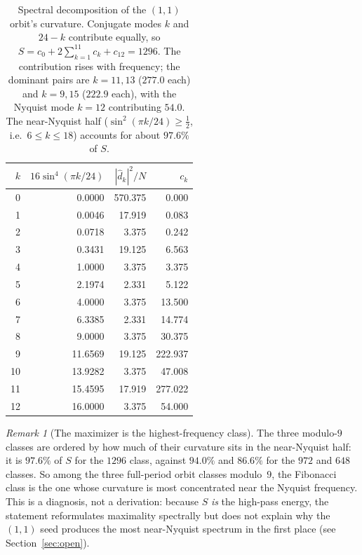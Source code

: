 \documentclass[12pt]{article}
\theoremstyle{remark}
\newtheorem{rem}{Remark}
\begin{document}
\begin{table}[h!]
\centering
\begin{tabular}{rrrr}
\toprule
$k$ & $16\sin^4(\pi k/24)$ & $|\hat d_k|^2/N$ & $c_k$\\
\midrule
0  & 0.0000  & 570.375 & 0.000\\
1  & 0.0046  & 17.919  & 0.083\\
2  & 0.0718  & 3.375   & 0.242\\
3  & 0.3431  & 19.125  & 6.563\\
4  & 1.0000  & 3.375   & 3.375\\
5  & 2.1974  & 2.331   & 5.122\\
6  & 4.0000  & 3.375   & 13.500\\
7  & 6.3385  & 2.331   & 14.774\\
8  & 9.0000  & 3.375   & 30.375\\
9  & 11.6569 & 19.125  & 222.937\\
10 & 13.9282 & 3.375   & 47.008\\
11 & 15.4595 & 17.919  & 277.022\\
12 & 16.0000 & 3.375   & 54.000\\
\bottomrule
\end{tabular}
\caption{Spectral decomposition of the $(1,1)$ orbit's curvature. Conjugate modes $k$ and
$24-k$ contribute equally, so $S=c_0+2\sum_{k=1}^{11}c_k+c_{12}=1296$. The contribution
rises with frequency; the dominant pairs are $k=11,13$ ($277.0$ each) and $k=9,15$
($222.9$ each), with the Nyquist mode $k=12$ contributing $54.0$. The near-Nyquist half
($\sin^2(\pi k/24)\ge\frac12$, i.e.\ $6\le k\le 18$) accounts for about $97.6\%$ of $S$.}
\label{tab:spectrum}
\end{table}

\begin{rem}[The maximizer is the highest-frequency class]
The three modulo-$9$ classes are ordered by how much of their curvature sits in the
near-Nyquist half: it is $97.6\%$ of $S$ for the $1296$ class, against $94.0\%$ and
$86.6\%$ for the $972$ and $648$ classes. So among the three full-period orbit classes
modulo~$9$, the Fibonacci class is the one whose curvature is most concentrated near the
Nyquist frequency. This is a diagnosis, not a derivation: because $S$ \emph{is} the
high-pass energy, the statement reformulates maximality spectrally but does not explain
why the $(1,1)$ seed produces the most near-Nyquist spectrum in the first place
(see Section~\ref{sec:open}).
\end{rem}
\end{document}

